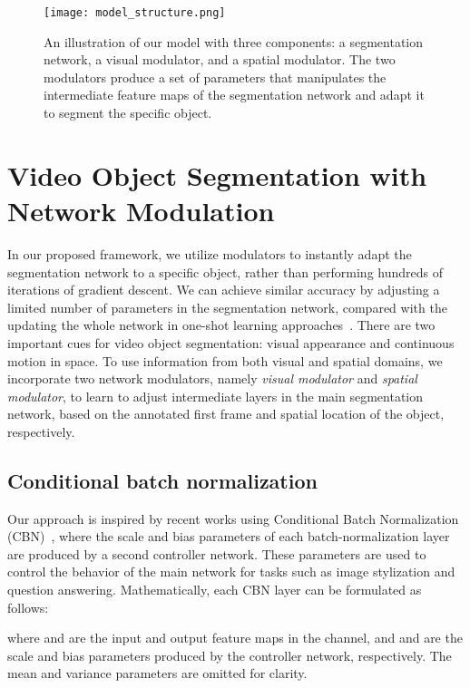 \documentclass[10pt,twocolumn,letterpaper]{article}
\begin{document}
\begin{figure*}[t]\centering
\texttt{[image: model\_structure.png]}
\caption{An illustration of our model with three components: a segmentation network, a visual modulator, and a spatial modulator. The two modulators produce a set of parameters that manipulates the intermediate feature maps of the segmentation network and adapt it to segment the specific object.}
\label{fig:model}\vspace{-2pt}
\end{figure*}

\section{Video Object Segmentation with Network Modulation}

In our proposed framework, we utilize modulators to instantly adapt the segmentation network to a specific object, rather than performing hundreds of iterations of gradient descent. We can achieve similar accuracy by adjusting a limited number of parameters in the segmentation network, compared with the updating the whole network in one-shot learning approaches~\cite{Perazzi2017masktrack, Caelles2017osvos}. There are two important cues for video object segmentation: visual appearance and continuous motion in space. To use information from both visual and spatial domains, we incorporate two network modulators, namely \emph{visual modulator} and \emph{spatial modulator}, to learn to adjust intermediate layers in the main segmentation network, based on the annotated first frame and spatial location of the object, respectively.

\subsection{Conditional batch normalization}

Our approach is inspired by recent works using Conditional Batch Normalization (CBN)~\cite{Vries2017ModulatingEV,Huang2017ArbitraryST,Perez2017LearningVR}, where the scale and bias parameters of each batch-normalization layer are produced by a second controller network. These parameters are used to control the behavior of the main network for tasks such as image stylization and question answering. Mathematically, each CBN layer can be formulated as follows:

where  and  are the input and output feature maps in the  channel, and  and  are the scale and bias parameters produced by the controller network, respectively. The mean and variance parameters are omitted for clarity.
\end{document}
